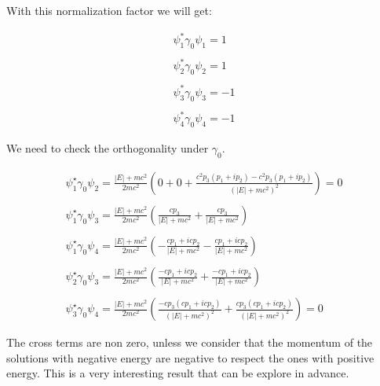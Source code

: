 With this normalization factor we will get:

\begin{equation}
  \begin{array}{c}
    \psi_1^*\gamma_0\psi_1 = 1
    \\

    \\
    \psi_2^*\gamma_0\psi_2 = 1
    \\

    \\
    \psi_3^*\gamma_0\psi_3 = -1
    \\

    \\
    \psi_4^*\gamma_0\psi_4 = -1
  \end{array}
\end{equation}

We need to check the orthogonality under $\gamma_0$.

\begin{equation}
  \begin{array}{c}
  \psi_{1}^\star \gamma_0\psi_2 = \frac{|E| + mc^2}{2mc^2} \left(0+0+\frac{c^2p_3(p_1+ip_2)-c^2p_3(p_1+ip_2)}{(|E|+mc^2)^2}\right) = 0
  \\

  \\
  \psi_{1}^\star \gamma_0 \psi_3 = \frac{|E| + mc^2}{2mc^2} \left(\frac{cp_3}{|E|+mc^2}+\frac{cp_3}{|E|+mc^2}\right)
  \\

  \\
  \psi_{1}^\star \gamma_0 \psi_4 = \frac{|E| + mc^2}{2mc^2} \left(-\frac{cp_1+icp_2}{|E|+mc^2}-\frac{cp_1+icp_2}{|E|+mc^2}\right)
  \\

  \\
  \psi_{2}^\star \gamma_0 \psi_3 = \frac{|E| + mc^2}{2mc^2} \left(\frac{-cp_1+icp_2}{|E|+mc^2}+\frac{-cp_1+icp_2}{|E|+mc^2}\right)
  \\

  \\
  \psi_{3}^\star \gamma_0 \psi_4 = \frac{|E| + mc^2}{2mc^2} \left(\frac{-cp_3(cp_1+icp_2)}{(|E|+mc^2)^2}+\frac{cp_3(cp_1+icp_2)}{(|E|+mc^2)^2}\right) = 0
  \end{array}
\end{equation}

The cross terms are non zero, unless we consider that the momentum of the solutions with negative energy are negative to respect the ones with positive energy. This is a very interesting result that can be explore in advance.
